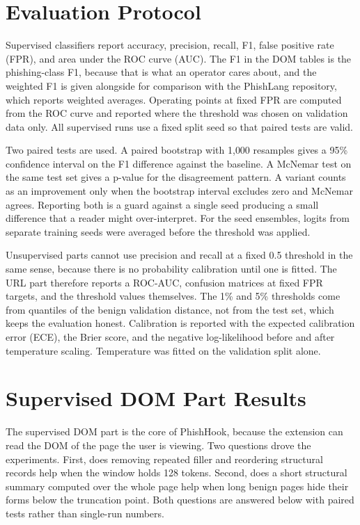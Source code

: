 \documentclass{FastFyp}
\begin{document}
\section{Evaluation Protocol}
\label{sec:protocol}

Supervised classifiers report accuracy, precision, recall, F1, false positive rate (FPR), and area under the ROC curve (AUC). The F1 in the DOM tables is the phishing-class F1, because that is what an operator cares about, and the weighted F1 is given alongside for comparison with the PhishLang repository, which reports weighted averages. Operating points at fixed FPR are computed from the ROC curve and reported where the threshold was chosen on validation data only. All supervised runs use a fixed split seed so that paired tests are valid.

Two paired tests are used. A paired bootstrap with 1{,}000 resamples gives a 95\% confidence interval on the F1 difference against the baseline. A McNemar test on the same test set gives a p-value for the disagreement pattern. A variant counts as an improvement only when the bootstrap interval excludes zero and McNemar agrees. Reporting both is a guard against a single seed producing a small difference that a reader might over-interpret. For the seed ensembles, logits from separate training seeds were averaged before the threshold was applied.

Unsupervised parts cannot use precision and recall at a fixed 0.5 threshold in the same sense, because there is no probability calibration until one is fitted. The URL part therefore reports a ROC-AUC, confusion matrices at fixed FPR targets, and the threshold values themselves. The 1\% and 5\% thresholds come from quantiles of the benign validation distance, not from the test set, which keeps the evaluation honest. Calibration is reported with the expected calibration error (ECE), the Brier score, and the negative log-likelihood before and after temperature scaling. Temperature was fitted on the validation split alone.

\section{Supervised DOM Part Results}
\label{sec:dom-results}

The supervised DOM part is the core of PhishHook, because the extension can read the DOM of the page the user is viewing. Two questions drove the experiments. First, does removing repeated filler and reordering structural records help when the window holds 128 tokens. Second, does a short structural summary computed over the whole page help when long benign pages hide their forms below the truncation point. Both questions are answered below with paired tests rather than single-run numbers.
\end{document}
